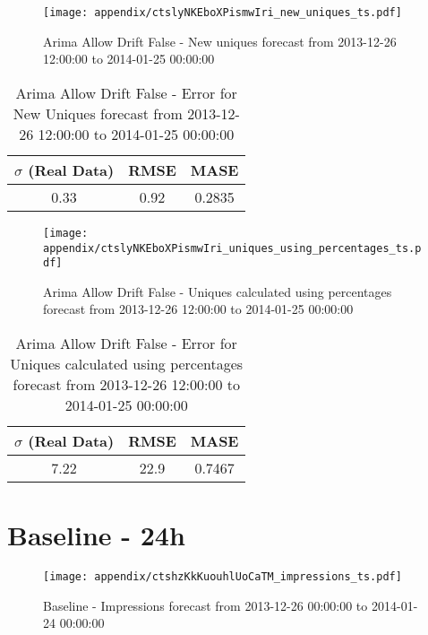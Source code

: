 \begin{figure}[H] \begin{center} \leavevmode
\texttt{[image: appendix/ctslyNKEboXPismwIri\_new\_uniques\_ts.pdf]} \caption{
Arima Allow Drift False - New uniques forecast from 2013-12-26 12:00:00 to 2014-01-25 00:00:00} \label{fig:appendix/ctslyNKEboXPismwIri_new_uniques_ts.pdf} \end{center}
\end{figure}

\begin{table}[H]
\centering
\footnotesize
\begin{tabular}{ccc}
$\sigma$ (Real Data) & RMSE & MASE   \\ \hline
0.33 & 0.92 & 0.2835 \\
\end{tabular}

\vspace{0.5cm}

\caption{
Arima Allow Drift False - Error for New Uniques forecast from 2013-12-26 12:00:00 to 2014-01-25 00:00:00}
\end{table}

\begin{figure}[H] \begin{center} \leavevmode
\texttt{[image: appendix/ctslyNKEboXPismwIri\_uniques\_using\_percentages\_ts.pdf]} \caption{
Arima Allow Drift False - Uniques calculated using percentages forecast from 2013-12-26 12:00:00 to 2014-01-25 00:00:00} \label{fig:appendix/ctslyNKEboXPismwIri_uniques_using_percentages_ts.pdf} \end{center}
\end{figure}

\begin{table}[H]
\centering
\footnotesize
\begin{tabular}{ccc}
$\sigma$ (Real Data) & RMSE & MASE   \\ \hline
7.22 & 22.9 & 0.7467 \\
\end{tabular}

\vspace{0.5cm}

\caption{
Arima Allow Drift False - Error for Uniques calculated using percentages forecast from 2013-12-26 12:00:00 to 2014-01-25 00:00:00}
\end{table}

\section{Baseline - 24h}
\begin{figure}[H] \begin{center} \leavevmode
\texttt{[image: appendix/ctshzKkKuouhlUoCaTM\_impressions\_ts.pdf]} \caption{
Baseline - Impressions forecast from 2013-12-26 00:00:00 to 2014-01-24 00:00:00} \label{fig:appendix/ctshzKkKuouhlUoCaTM_impressions_ts.pdf} \end{center}
\end{figure}

